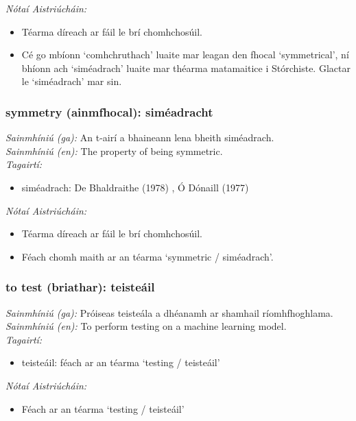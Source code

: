  \noindent \textit{Nótaí Aistriúcháin:}
\begin{itemize}
	\item Téarma díreach ar fáil le brí chomhchosúil.
	\item Cé go mbíonn `comhchruthach' luaite mar leagan den fhocal `symmetrical', ní bhíonn ach `siméadrach' luaite mar théarma matamaitice i Stórchiste. Glactar le `siméadrach' mar sin.
\end{itemize}


\subsubsection*{symmetry (ainmfhocal): siméadracht}
 \noindent \textit{Sainmhíniú (ga):} An t-airí a bhaineann lena bheith siméadrach.
\\
 \noindent \textit{Sainmhíniú (en):} The property of being symmetric.
\\
 \noindent \textit{Tagairtí:}
\begin{itemize}
	\item siméadrach: De Bhaldraithe (1978) \cite{de-bhaldraithe}, Ó Dónaill (1977) \cite{odonaill}
\end{itemize}

 \noindent \textit{Nótaí Aistriúcháin:}
\begin{itemize}
	\item Téarma díreach ar fáil le brí chomhchosúil.
	\item Féach chomh maith ar an téarma `symmetric / siméadrach'.
\end{itemize}


\subsubsection*{to test (briathar): teisteáil}
 \noindent \textit{Sainmhíniú (ga):} Próiseas teisteála a dhéanamh ar shamhail ríomhfhoghlama.
\\
 \noindent \textit{Sainmhíniú (en):} To perform testing on a machine learning model.
\\
 \noindent \textit{Tagairtí:}
\begin{itemize}
	\item teisteáil: féach ar an téarma `testing / teisteáil'
\end{itemize}

 \noindent \textit{Nótaí Aistriúcháin:}
\begin{itemize}
	\item Féach ar an téarma `testing / teisteáil'
\end{itemize}


